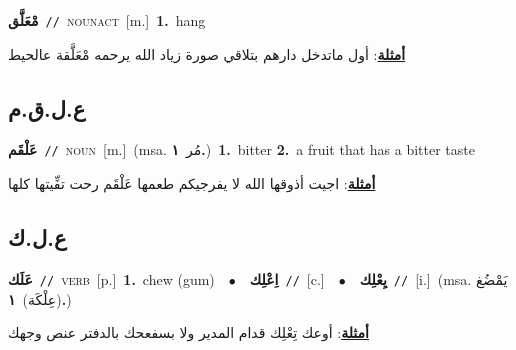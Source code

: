 \documentclass[10pt,a4paper,twoside]{article} %
\begin{document}
\begin{multicols}{2}
{\setlength\topsep{0pt}\textbf{\foreignlanguage{arabic}{مْعَلَّق}}\ {\color{gray}\texttt{//}\color{black}}\ \textsc{noun\textunderscore act}\ [m.]\ \textbf{1.}~hang\  \begin{flushright}\color{gray}\foreignlanguage{arabic}{\textbf{\underline{\foreignlanguage{arabic}{أمثلة}}}: أول ماتدخل دارهم بتلاقي صورة زياد الله يرحمه مْعَلَّقة عالحيط}\end{flushright}\color{black}} \vspace{2mm}

\vspace{-3mm}
\subsection*{\color{blue}\foreignlanguage{arabic}{ع.ل.ق.م}\color{blue}{}} 

{\setlength\topsep{0pt}\textbf{\foreignlanguage{arabic}{عَلْقَم}}\ {\color{gray}\texttt{//}\color{black}}\ \textsc{noun}\ [m.]\ \color{gray}(msa. \foreignlanguage{arabic}{مُر}~\foreignlanguage{arabic}{\textbf{١.}})\color{black}\ \textbf{1.}~bitter  \textbf{2.}~a fruit that has a bitter taste\  \begin{flushright}\color{gray}\foreignlanguage{arabic}{\textbf{\underline{\foreignlanguage{arabic}{أمثلة}}}: اجيت أذوقها الله لا يفرجيكم طعمها عَلْقَم رحت تفِّيتها كلها}\end{flushright}\color{black}} \vspace{2mm}

\vspace{-3mm}
\subsection*{\color{blue}\foreignlanguage{arabic}{ع.ل.ك}\color{blue}{}} 

{\setlength\topsep{0pt}\textbf{\foreignlanguage{arabic}{عَلَك}}\ {\color{gray}\texttt{//}\color{black}}\ \textsc{verb}\ [p.]\ \textbf{1.}~chew (gum)\ \ $\bullet$\ \ \setlength\topsep{0pt}\textbf{\foreignlanguage{arabic}{اِعْلِك}}\ {\color{gray}\texttt{//}\color{black}}\ [c.]\ \ $\bullet$\ \ \setlength\topsep{0pt}\textbf{\foreignlanguage{arabic}{يِعْلِك}}\ {\color{gray}\texttt{//}\color{black}}\ [i.]\ \color{gray}(msa. \foreignlanguage{arabic}{يَمْضُغ (عِلْكَة)}~\foreignlanguage{arabic}{\textbf{١.}})\color{black}\  \begin{flushright}\color{gray}\foreignlanguage{arabic}{\textbf{\underline{\foreignlanguage{arabic}{أمثلة}}}: أوعك تِعْلِك قدام المدير ولا بسفعحك بالدفتر عنص وجهك}\end{flushright}\color{black}} \vspace{2mm}


\end{multicols}
\end{document}
